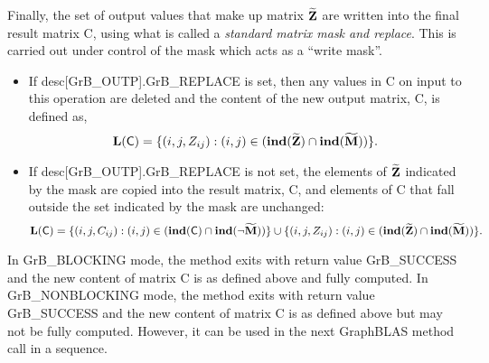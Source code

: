 
Finally, the set of output values that make up matrix ${\bf \widetilde{Z}}$ 
are written into the final result matrix {\sf C}, using what is called
a \emph{standard matrix mask and replace}. 
This is carried out under control of the mask which acts as a ``write mask''.
\begin{itemize}
\item If {\sf desc[GrB\_OUTP].GrB\_REPLACE} is set, then any values in {\sf C} on
input to this operation are deleted and the content of the new output matrix,
{\sf C}, is defined as,
\[
\bold{L}({\sf C}) = \{(i,j,Z_{ij}) : (i,j) \in (\bold{ind}({\bf \widetilde{Z}}) 
\cap \bold{ind}({\bf \widetilde{M}})) \}. 
\]

\item If {\sf desc[GrB\_OUTP].GrB\_REPLACE} is not set, the elements of 
${\bf \widetilde{Z}}$ indicated by the mask are copied into the result 
matrix, {\sf C}, and elements of {\sf C} that fall outside the set 
indicated by the mask are unchanged:
\[
\bold{L}({\sf C}) = \{(i,j,C_{ij}) : (i,j) \in (\bold{ind}({\sf C}) 
\cap \bold{ind}(\neg {\bf \widetilde{M}})) \} \cup \{(i,j,Z_{ij}) : (i,j) \in 
(\bold{ind}({\bf \widetilde{Z}}) \cap \bold{ind}({\bf \widetilde{M}})) \}.
\]
\end{itemize}

In {\sf GrB\_BLOCKING} mode, the method exits with return value 
{\sf GrB\_SUCCESS} and the new content of matrix {\sf C} is as defined above
and fully computed.
In {\sf GrB\_NONBLOCKING} mode, the method exits with return value 
{\sf GrB\_SUCCESS} and the new content of matrix {\sf C} is as defined above
but may not be fully computed. However, it can be used in the next GraphBLAS 
method call in a sequence.
